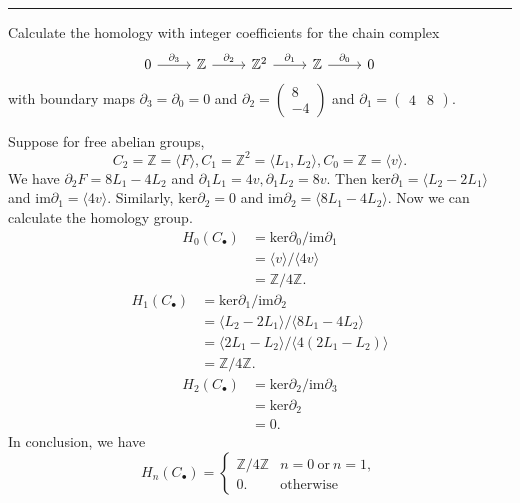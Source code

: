 \documentclass[a4paper, 11pt]{article}
\begin{document}
\\ 
\noindent\rule{7in}{2.8pt}
\begin{problem}{5}
Calculate the homology with integer coefficients for the chain complex 
$$\begin{tikzcd}
	0 & {\mathbb{Z}} & {\mathbb{Z}^2} & {\mathbb{Z}} & 0
	\arrow["{\partial_3}", from=1-1, to=1-2]
	\arrow["{\partial_2}", from=1-2, to=1-3]
	\arrow["{\partial_1}", from=1-3, to=1-4]
	\arrow["{\partial_0}", from=1-4, to=1-5]
\end{tikzcd}$$
with boundary maps \(\partial_3=\partial_0=0\) and \(\partial_2=\begin{pmatrix}
     8\\
    -4
\end{pmatrix}\) and \(\partial_1=\begin{pmatrix}
    4 & 8
\end{pmatrix}\).
\end{problem}
\begin{solution}
Suppose for free abelian groups, 
$$C_2=\mathbb{Z}=\langle F\rangle, C_1=\mathbb{Z}^2=\langle L_1,L_2\rangle, C_0=\mathbb{Z}=\langle v\rangle.$$
We have \(\partial_2 F=8L_1-4L_2\) and \(\partial_1 L_1=4v, \partial_1 L_2=8v\). Then \(\text{ker}\partial_1=\langle L_2-2L_1\rangle\) and \(\text{im}\partial_1=\langle 4v\rangle\). 
Similarly, \(\text{ker}\partial_2=0\) and \(\text{im}\partial_2=\langle 8L_1-4L_2\rangle\). Now we can calculate the homology group.
\begin{align*}
    H_0(C_\bullet) & = \text{ker}\partial_0/\text{im}\partial_1\\ 
                   & = \langle v\rangle / \langle 4v\rangle \\ 
                   & = \mathbb{Z}/4 \mathbb{Z}.
\end{align*}
\begin{align*}
    H_1(C_\bullet) & = \text{ker}\partial_1/\text{im}\partial_2\\ 
                   & = \langle L_2-2L_1\rangle /\langle 8L_1-4L_2\rangle \\ 
                   & = \langle 2L_1-L_2\rangle /\langle 4(2L_1-L_2)\rangle \\ 
                   & = \mathbb{Z}/4 \mathbb{Z}.
\end{align*}
\begin{align*}
    H_2(C_\bullet) & = \text{ker}\partial_2/\text{im}\partial_3 \\ 
                   & =\text{ker}\partial_2\\ 
                   & =0.
\end{align*}
In conclusion, we have 
$$H_n(C_\bullet)=\begin{cases}
    \mathbb{Z}/4 \mathbb{Z} & n=0\ \text{or} \ n=1,\\ 
     0. & \text{otherwise} 
\end{cases}$$
\end{solution}
\end{document}
